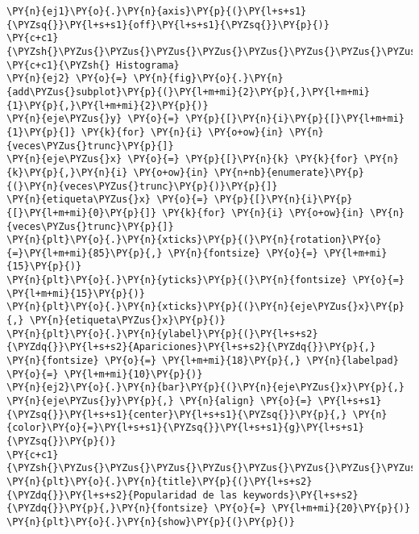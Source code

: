 \begin{tcolorbox}[breakable, size=fbox, boxrule=1pt, pad at break*=1mm,colback=cellbackground, colframe=cellborder]
\begin{Verbatim}[commandchars=\\\{\}]
\PY{n}{ej1}\PY{o}{.}\PY{n}{axis}\PY{p}{(}\PY{l+s+s1}{\PYZsq{}}\PY{l+s+s1}{off}\PY{l+s+s1}{\PYZsq{}}\PY{p}{)}
\PY{c+c1}{\PYZsh{}\PYZus{}\PYZus{}\PYZus{}\PYZus{}\PYZus{}\PYZus{}\PYZus{}\PYZus{}\PYZus{}\PYZus{}\PYZus{}\PYZus{}\PYZus{}\PYZus{}\PYZus{}\PYZus{}\PYZus{}\PYZus{}\PYZus{}\PYZus{}\PYZus{}\PYZus{}\PYZus{}\PYZus{}\PYZus{}\PYZus{}\PYZus{}\PYZus{}\PYZus{}\PYZus{}\PYZus{}\PYZus{}\PYZus{}\PYZus{}\PYZus{}\PYZus{}\PYZus{}\PYZus{}\PYZus{}\PYZus{}\PYZus{}\PYZus{}\PYZus{}\PYZus{}\PYZus{}}
\PY{c+c1}{\PYZsh{} Histograma}
\PY{n}{ej2} \PY{o}{=} \PY{n}{fig}\PY{o}{.}\PY{n}{add\PYZus{}subplot}\PY{p}{(}\PY{l+m+mi}{2}\PY{p}{,}\PY{l+m+mi}{1}\PY{p}{,}\PY{l+m+mi}{2}\PY{p}{)}
\PY{n}{eje\PYZus{}y} \PY{o}{=} \PY{p}{[}\PY{n}{i}\PY{p}{[}\PY{l+m+mi}{1}\PY{p}{]} \PY{k}{for} \PY{n}{i} \PY{o+ow}{in} \PY{n}{veces\PYZus{}trunc}\PY{p}{]}
\PY{n}{eje\PYZus{}x} \PY{o}{=} \PY{p}{[}\PY{n}{k} \PY{k}{for} \PY{n}{k}\PY{p}{,}\PY{n}{i} \PY{o+ow}{in} \PY{n+nb}{enumerate}\PY{p}{(}\PY{n}{veces\PYZus{}trunc}\PY{p}{)}\PY{p}{]}
\PY{n}{etiqueta\PYZus{}x} \PY{o}{=} \PY{p}{[}\PY{n}{i}\PY{p}{[}\PY{l+m+mi}{0}\PY{p}{]} \PY{k}{for} \PY{n}{i} \PY{o+ow}{in} \PY{n}{veces\PYZus{}trunc}\PY{p}{]}
\PY{n}{plt}\PY{o}{.}\PY{n}{xticks}\PY{p}{(}\PY{n}{rotation}\PY{o}{=}\PY{l+m+mi}{85}\PY{p}{,} \PY{n}{fontsize} \PY{o}{=} \PY{l+m+mi}{15}\PY{p}{)}
\PY{n}{plt}\PY{o}{.}\PY{n}{yticks}\PY{p}{(}\PY{n}{fontsize} \PY{o}{=} \PY{l+m+mi}{15}\PY{p}{)}
\PY{n}{plt}\PY{o}{.}\PY{n}{xticks}\PY{p}{(}\PY{n}{eje\PYZus{}x}\PY{p}{,} \PY{n}{etiqueta\PYZus{}x}\PY{p}{)}
\PY{n}{plt}\PY{o}{.}\PY{n}{ylabel}\PY{p}{(}\PY{l+s+s2}{\PYZdq{}}\PY{l+s+s2}{Apariciones}\PY{l+s+s2}{\PYZdq{}}\PY{p}{,} \PY{n}{fontsize} \PY{o}{=} \PY{l+m+mi}{18}\PY{p}{,} \PY{n}{labelpad} \PY{o}{=} \PY{l+m+mi}{10}\PY{p}{)}
\PY{n}{ej2}\PY{o}{.}\PY{n}{bar}\PY{p}{(}\PY{n}{eje\PYZus{}x}\PY{p}{,} \PY{n}{eje\PYZus{}y}\PY{p}{,} \PY{n}{align} \PY{o}{=} \PY{l+s+s1}{\PYZsq{}}\PY{l+s+s1}{center}\PY{l+s+s1}{\PYZsq{}}\PY{p}{,} \PY{n}{color}\PY{o}{=}\PY{l+s+s1}{\PYZsq{}}\PY{l+s+s1}{g}\PY{l+s+s1}{\PYZsq{}}\PY{p}{)}
\PY{c+c1}{\PYZsh{}\PYZus{}\PYZus{}\PYZus{}\PYZus{}\PYZus{}\PYZus{}\PYZus{}\PYZus{}\PYZus{}\PYZus{}\PYZus{}\PYZus{}\PYZus{}\PYZus{}\PYZus{}\PYZus{}\PYZus{}\PYZus{}\PYZus{}\PYZus{}\PYZus{}\PYZus{}\PYZus{}}
\PY{n}{plt}\PY{o}{.}\PY{n}{title}\PY{p}{(}\PY{l+s+s2}{\PYZdq{}}\PY{l+s+s2}{Popularidad de las keywords}\PY{l+s+s2}{\PYZdq{}}\PY{p}{,}\PY{n}{fontsize} \PY{o}{=} \PY{l+m+mi}{20}\PY{p}{)}
\PY{n}{plt}\PY{o}{.}\PY{n}{show}\PY{p}{(}\PY{p}{)}
\end{Verbatim}
\end{tcolorbox}

